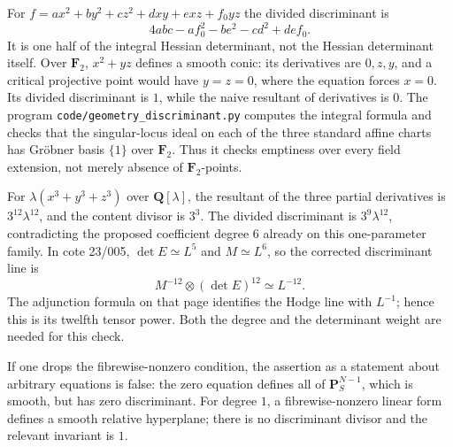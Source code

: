 \begin{example}
\label{geo-E-conic}
For $f=ax^2+by^2+cz^2+dxy+exz+f_0yz$ the divided discriminant is
\[
 4abc-af_0^2-be^2-cd^2+def_0.
\]
It is one half of the integral Hessian determinant, not the Hessian
determinant itself. Over $\mathbf F_2$, $x^2+yz$ defines a smooth conic:
its derivatives are $0,z,y$, and a critical projective point would have
$y=z=0$, where the equation forces $x=0$. Its divided discriminant is $1$,
while the naive resultant of derivatives is $0$. The program
\texttt{code/geometry\_discriminant.py} computes the integral formula and
checks that the singular-locus ideal on each of the three standard affine
charts has Gr\"obner basis $\{1\}$ over $\mathbf F_2$. Thus it checks emptiness
over every field extension, not merely absence of $\mathbf F_2$-points.
\end{example}

\begin{example}
\label{geo-E-cubic}
For $\lambda(x^3+y^3+z^3)$ over $\mathbf Q[\lambda]$, the resultant of the
three partial derivatives is $3^{12}\lambda^{12}$, and the content divisor
is $3^3$. The divided discriminant is $3^9\lambda^{12}$, contradicting
the proposed coefficient degree $6$ already on this one-parameter family.
In cote 23/005, $\det E\simeq L^5$ and $M\simeq L^6$, so the corrected
discriminant line is
\[
 M^{-12}\otimes(\det E)^{12}\simeq L^{-12}.
\]
The adjunction formula on that page identifies the Hodge line with $L^{-1}$;
hence this is its twelfth tensor power. Both the degree and the determinant
weight are needed for this check.
\end{example}

If one drops the fibrewise-nonzero condition, the assertion as a statement
about arbitrary equations is false: the zero equation defines all of
$\mathbf P^{N-1}_S$, which is smooth, but has zero discriminant. For degree
$1$, a fibrewise-nonzero linear form defines a smooth relative hyperplane;
there is no discriminant divisor and the relevant invariant is $1$.

